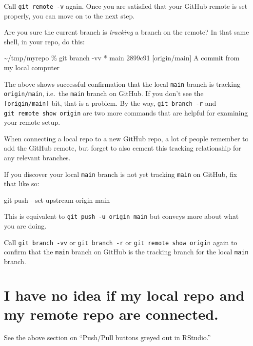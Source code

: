 \documentclass[
]{book}
\newenvironment{Shaded}{\begin{snugshade}}{\end{snugshade}}
\newcommand{\NormalTok}[1]{#1}
\begin{document}
Call \texttt{git\ remote\ -v} again.
Once you are satisfied that your GitHub remote is set properly, you can move on to the next step.

Are you sure the current branch is \emph{tracking} a branch on the remote?
In that same shell, in your repo, do this:

\begin{Shaded}
\begin{Highlighting}[]
\NormalTok{\textasciitilde{}/tmp/myrepo \% git branch {-}vv}
\NormalTok{* main 2899c91 [origin/main] A commit from my local computer}
\end{Highlighting}
\end{Shaded}

The above shows successful confirmation that the local \texttt{main} branch is tracking \texttt{origin/main}, i.e.~the \texttt{main} branch on GitHub.
If you don't see the \texttt{{[}origin/main{]}} bit, that is a problem.
By the way, \texttt{git\ branch\ -r} and \texttt{git\ remote\ show\ origin} are two more commands that are helpful for examining your remote setup.

When connecting a local repo to a new GitHub repo, a lot of people remember to add the GitHub remote, but forget to also cement this tracking relationship for any relevant branches.

If you discover your local \texttt{main} branch is not yet tracking \texttt{main} on GitHub, fix that like so:

\begin{Shaded}
\begin{Highlighting}[]
\NormalTok{git push {-}{-}set{-}upstream origin main}
\end{Highlighting}
\end{Shaded}

This is equivalent to \texttt{git\ push\ -u\ origin\ main} but conveys more about what you are doing.

Call \texttt{git\ branch\ -vv} or \texttt{git\ branch\ -r} or \texttt{git\ remote\ show\ origin} again to confirm that the \texttt{main} branch on GitHub is the tracking branch for the local \texttt{main} branch.

\section{I have no idea if my local repo and my remote repo are connected.}\label{i-have-no-idea-if-my-local-repo-and-my-remote-repo-are-connected.}

See the above section on ``Push/Pull buttons greyed out in RStudio.''
\end{document}
